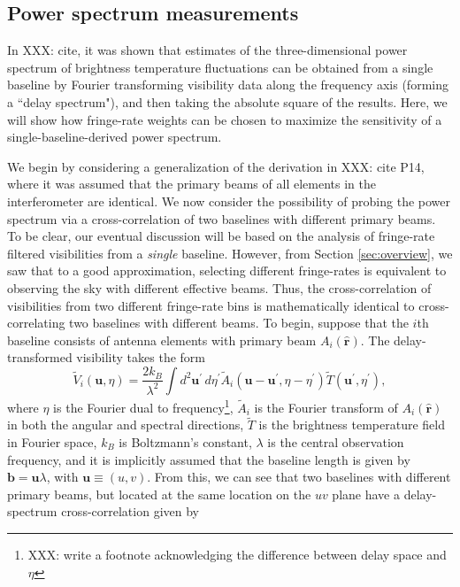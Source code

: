 \documentclass[twocolumn,apj,numberedappendix]{emulateapj}
\newcommand{\rhat}{\hat{\mathbf{r}}}
\begin{document}
\subsection{Power spectrum measurements}

In XXX: cite, it was shown that estimates of the three-dimensional power spectrum of brightness temperature fluctuations can be obtained from a single baseline by Fourier transforming visibility data along the frequency axis (forming a ``delay spectrum"), and then taking the absolute square of the results. Here, we will show how fringe-rate weights can be chosen to maximize the sensitivity of a single-baseline-derived power spectrum.

We begin by considering a generalization of the derivation in XXX: cite P14, where it was assumed that the primary beams of all elements in the interferometer are identical. We now consider the possibility of probing the power spectrum via a cross-correlation of two baselines with different primary beams. To be clear, our eventual discussion will be based on the analysis of fringe-rate filtered visibilities from a \emph{single} baseline. However, from Section \ref{sec:overview}, we saw that to a good approximation, selecting different fringe-rates is equivalent to observing the sky with different effective beams. Thus, the cross-correlation of visibilities from two different fringe-rate bins is mathematically identical to cross-correlating two baselines with different beams. To begin, suppose that the $i$th baseline consists of antenna elements with primary beam $A_i (\rhat)$. The delay-transformed visibility takes the form
\begin{equation}
\widetilde{V}_i(\mathbf{u},\eta) = \frac{2 k_B}{\lambda^2} \int  d^2 \mathbf{u}^\prime \, d\eta^\prime \widetilde{A}_i (\mathbf{u} -\mathbf{u}^\prime, \eta-\eta^\prime) \widetilde{T}(\mathbf{u}^\prime , \eta^\prime),
\end{equation}
where $\eta$ is the Fourier dual to frequency\footnote{XXX: write a footnote acknowledging the difference between delay space and $\eta$}, $\widetilde{A}_i $ is the Fourier transform of $A_i (\rhat)$ in both the angular and spectral directions, $\widetilde{T}$ is the brightness temperature field in Fourier space, $k_B$ is Boltzmann's constant, $\lambda$ is the central observation frequency, and it is implicitly assumed that the baseline length is given by $\mathbf{b} = \mathbf{u} \lambda$, with $\mathbf{u} \equiv (u,v)$. From this, we can see that two baselines with different primary beams, but located at the same location on the $uv$ plane have a delay-spectrum cross-correlation given by
\end{document}

